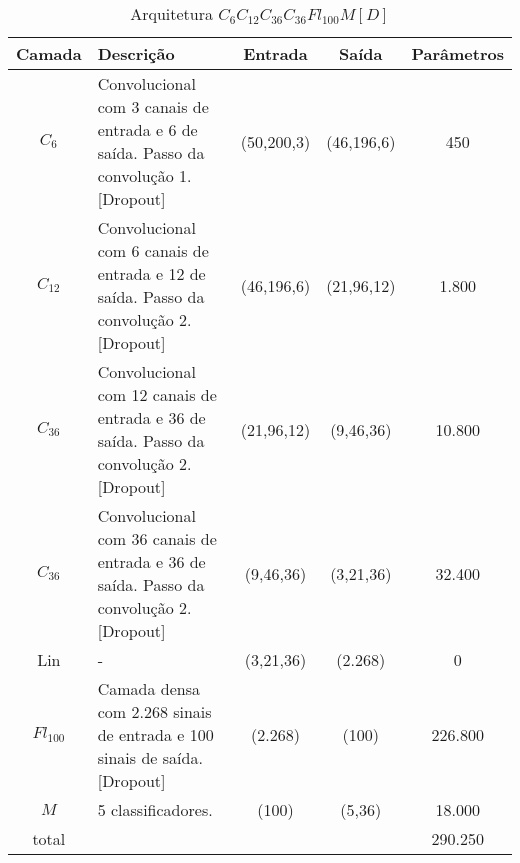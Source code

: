 \noindent
\begin{table}[!p]
	\begin{center}
		\caption{Arquitetura $C_6C_{12}C_{36}C_{36}Fl_{100}M[D]$}
		\label{tab_ccccfmd}
	\end{center}
\begin{tabularx}{\linewidth}{ |c|X|c|c|c| }
	\hline
	Camada & Descrição & Entrada & Saída & Parâmetros \\ \hline \hline
	$C_{6}$ & Convolucional com 3 canais de entrada e 6 de saída. Passo da convolução 1.  [Dropout] & (50,200,3) & (46,196,6) & 450 \\ \hline
	$C_{12}$ & Convolucional com 6 canais de entrada e 12 de saída. Passo da convolução 2.  [Dropout] & (46,196,6) & (21,96,12) & 1.800 \\ \hline
	$C_{36}$ & Convolucional com 12 canais de entrada e 36 de saída. Passo da convolução 2.  [Dropout] & (21,96,12) & (9,46,36) & 10.800 \\ \hline
	$C_{36}$ & Convolucional com 36 canais de entrada e 36 de saída. Passo da convolução 2.  [Dropout] & (9,46,36) & (3,21,36) & 32.400 \\ \hline
	Lin & - & (3,21,36) & (2.268) & 0 \\ \hline
	$Fl_{100}$ & Camada densa com 2.268 sinais de entrada e 100 sinais de saída.  [Dropout] & (2.268) & (100) & 226.800 \\ \hline
	$M$ & 5 classificadores. & (100) & (5,36) & 18.000 \\ \hline
	total &  &  &  & 290.250 \\ \hline
\end{tabularx}
\end{table}

